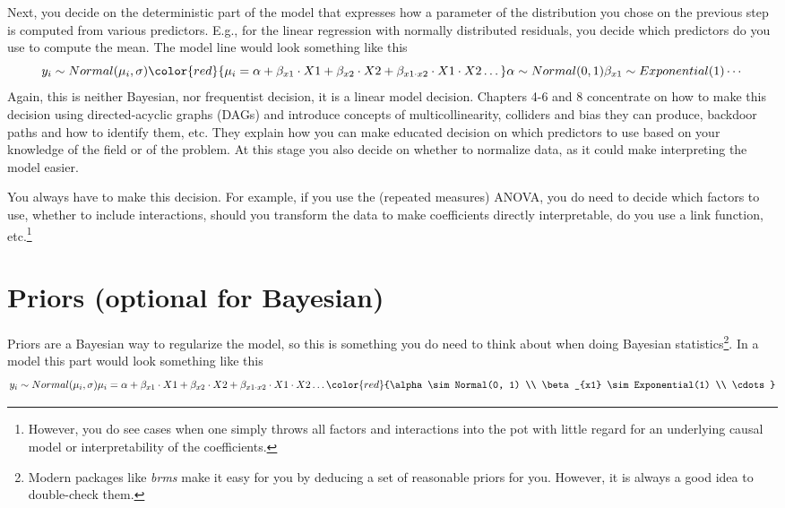 \documentclass[
]{book}
\begin{document}
Next, you decide on the deterministic part of the model that expresses how a parameter of the distribution you chose on the previous step is computed from various predictors. E.g., for the linear regression with normally distributed residuals, you decide which predictors do you use to compute the mean. The model line would look something like this
\[
y_i \sim Normal(\mu_i, \sigma) \\
\color{red}{\mu_i = \alpha + \beta_{x1} \cdot X1 + \beta_{x2} \cdot X2 + \beta_{x1\cdot x2} \cdot X1 \cdot X2 \dotso} \\
\alpha \sim Normal(0, 1) \\
\beta_{x1} \sim Exponential(1) \\
\cdots
\]
Again, this is neither Bayesian, nor frequentist decision, it is a linear model decision. Chapters 4-6 and 8 concentrate on how to make this decision using directed-acyclic graphs (DAGs) and introduce concepts of multicollinearity, colliders and bias they can produce, backdoor paths and how to identify them, etc. They explain how you can make educated decision on which predictors to use based on your knowledge of the field or of the problem. At this stage you also decide on whether to normalize data, as it could make interpreting the model easier.

You always have to make this decision. For example, if you use the (repeated measures) ANOVA, you do need to decide which factors to use, whether to include interactions, should you transform the data to make coefficients directly interpretable, do you use a link function, etc.\footnote{However, you do see cases when one simply throws all factors and interactions into the pot with little regard for an underlying causal model or interpretability of the coefficients.}

\hypertarget{priors-optional-for-bayesian}{%
\section{Priors (optional for Bayesian)}\label{priors-optional-for-bayesian}}

Priors are a Bayesian way to regularize the model, so this is something you do need to think about when doing Bayesian statistics\footnote{Modern packages like \emph{brms} make it easy for you by deducing a set of reasonable priors for you. However, it is always a good idea to double-check them.}. In a model this part would look something like this
\[
y_i \sim Normal(\mu_i, \sigma) \\
\mu_i = \alpha + \beta_{x1} \cdot X1 + \beta_{x2} \cdot X2 + \beta_{x1\cdot x2} \cdot X1 \cdot X2 \dotso \\
\color{red}{\alpha \sim Normal(0, 1) \\
\beta_{x1} \sim Exponential(1) \\
\cdots}
\]
\end{document}
